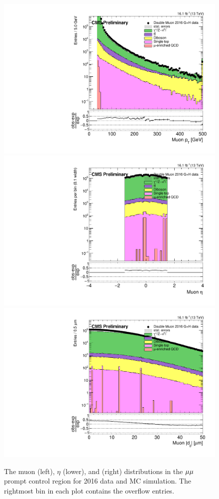 \begin{figure}[hbtp]
\centering
\includegraphics[scale=0.3]{figures/selection/pcr_mumu_2016/muonPt.pdf}
\includegraphics[scale=0.3]{figures/selection/pcr_mumu_2016/muonEta.pdf}
\includegraphics[scale=0.3]{figures/selection/pcr_mumu_2016/muonAbsD0_50um.pdf}
\caption{The muon \pt (left), $\eta$ (lower), and \ad (right) distributions in the ${\mu}{\mu}$ prompt control region for 2016 data and MC simulation. The rightmost bin in each plot
contains the overflow entries.}
\label{pcr_mumu_2016}
\end{figure}